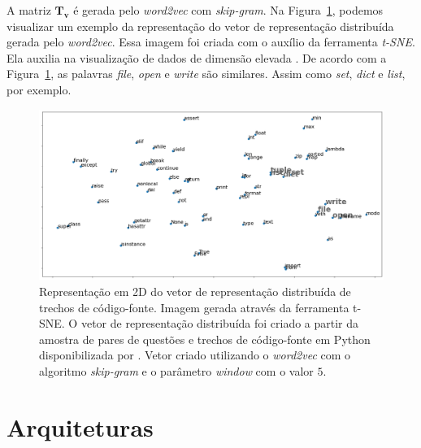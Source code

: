A matriz $\bm{T_{v}}$ é gerada pelo \textit{word2vec} com \textit{skip-gram}. Na Figura~\ref{fig:tsne-code-snippet-python}, podemos visualizar um exemplo da representação do vetor de representação distribuída gerada pelo \textit{word2vec}. Essa imagem foi criada com o auxílio da ferramenta \textit{t-SNE}. Ela auxilia na visualização de dados de dimensão elevada \citep{scikit-learn-tsne-2019, quora-tsne-2019}. De acordo com a Figura~\ref{fig:tsne-code-snippet-python}, as palavras \emph{file}, \emph{open}  e \emph{write} são similares. Assim como \emph{set}, \emph{dict} e \emph{list}, por exemplo.

\begin{figure}[h]
\includegraphics[width=1\textwidth]{figuras/cap-experimento/code_tsne.png}
\caption{Representação em 2D do vetor de representação distribuída de trechos de código-fonte. Imagem gerada através da ferramenta t-SNE. O vetor de representação distribuída foi criado a partir da amostra de pares de questões e trechos de código-fonte em Python disponibilizada por \cite{yao-2018}. Vetor criado utilizando o \textit{word2vec} com o algoritmo \textit{skip-gram} e o parâmetro \textit{window} com o valor $5$.}
\label{fig:tsne-code-snippet-python}
\end{figure}

\section{Arquiteturas}

